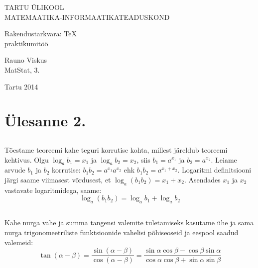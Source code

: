 \documentclass[a4paper,fleqn,12pt]{article}
\theoremstyle{definition}
\begin{document}
\begin{titlepage}
	\begin{center}
	
		\uppercase{Tartu Ülikool}\\[2mm]
		\uppercase{Matemaatika-Informaatikateaduskond}\\[2mm]

		\vspace{6cm}

		{\Huge Rakendustarkvara: \TeX}\\[2mm]
		{\large praktikumitöö}

		\vspace{6cm}

		\begin{flushright}
			\Large
			Rauno Viskus\\[2mm]
			MatStat, 3.
		\end{flushright}

		\vfill

		{\large Tartu 2014}
	\end{center}
\end{titlepage}
\section{Ülesanne 2.}

\subsection*{}

Tõestame teoreemi kahe teguri korrutise kohta, millest järeldub teoreemi kehtivus.
Olgu $\log_a b_1 = x_1$ ja $\log_a b_2 = x_2$, siis $b_1 = a^{x_1}$ ja $b_2 = a^{x_2}$. Leiame arvude $b_1$ ja $b_2$ korrutise: $b_1 b_2 = a^{x_1} a^{x_2}$ ehk $b_1 b_2 = a^{x_1 + x_2}$. Logaritmi definitsiooni järgi saame viimasest võrdusest, et $\log_a(b_1 b_2) = x_1 + x_2$. Asendades $x_1$ ja $x_2$ vastavate logaritmidega, saame:
\begin{displaymath}
	\log_a(b_1 b_2) = \log_a b_1 + \log_a b_2
\end{displaymath}

\subsection*{}

Kahe nurga vahe ja summa tangensi valemite tuletamiseks kasutame ühe ja sama nurga trigonomeetriliste funktsioonide vahelisi põhiseoseid ja eespool saadud valemeid:
\begin{displaymath}
	\tan(\alpha	- \beta)
		= \frac{\sin(\alpha	- \beta)}{\cos(\alpha	- \beta)}
		= \frac{\sin\alpha\cos\beta - \cos\beta\sin\alpha}
					 {\cos\alpha\cos\beta + \sin\alpha\sin\beta}
\end{displaymath}
\end{document}
